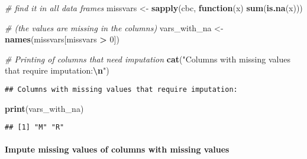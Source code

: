 \documentclass[
]{article}
\newenvironment{Shaded}{\begin{snugshade}}{\end{snugshade}}
\newcommand{\AttributeTok}[1]{\textcolor[rgb]{0.13,0.29,0.53}{#1}}
\newcommand{\CommentTok}[1]{\textcolor[rgb]{0.56,0.35,0.01}{\textit{#1}}}
\newcommand{\ConstantTok}[1]{\textcolor[rgb]{0.56,0.35,0.01}{#1}}
\newcommand{\ControlFlowTok}[1]{\textcolor[rgb]{0.13,0.29,0.53}{\textbf{#1}}}
\newcommand{\DecValTok}[1]{\textcolor[rgb]{0.00,0.00,0.81}{#1}}
\newcommand{\FunctionTok}[1]{\textcolor[rgb]{0.13,0.29,0.53}{\textbf{#1}}}
\newcommand{\NormalTok}[1]{#1}
\newcommand{\OtherTok}[1]{\textcolor[rgb]{0.56,0.35,0.01}{#1}}
\newcommand{\SpecialCharTok}[1]{\textcolor[rgb]{0.81,0.36,0.00}{\textbf{#1}}}
\newcommand{\StringTok}[1]{\textcolor[rgb]{0.31,0.60,0.02}{#1}}
\begin{document}
\begin{Shaded}
\begin{Highlighting}[]
\CommentTok{\# find it in all data frames }
\NormalTok{missvars }\OtherTok{\textless{}{-}} \FunctionTok{sapply}\NormalTok{(cbc, }\ControlFlowTok{function}\NormalTok{(x) }\FunctionTok{sum}\NormalTok{(}\FunctionTok{is.na}\NormalTok{(x)))}

\CommentTok{\# (the values are missing in the columns)}
\NormalTok{vars\_with\_na }\OtherTok{\textless{}{-}} \FunctionTok{names}\NormalTok{(missvars[missvars }\SpecialCharTok{\textgreater{}} \DecValTok{0}\NormalTok{])}

\CommentTok{\# Printing of columns that need imputation  }
\FunctionTok{cat}\NormalTok{(}\StringTok{"Columns with missing values that require imputation:}\SpecialCharTok{\textbackslash{}n}\StringTok{"}\NormalTok{)}
\end{Highlighting}
\end{Shaded}

\begin{verbatim}
## Columns with missing values that require imputation:
\end{verbatim}

\begin{Shaded}
\begin{Highlighting}[]
\FunctionTok{print}\NormalTok{(vars\_with\_na)}
\end{Highlighting}
\end{Shaded}

\begin{verbatim}
## [1] "M" "R"
\end{verbatim}

\paragraph{Impute missing values of columns with missing
values}\label{impute-missing-values-of-columns-with-missing-values}

\begin{Shaded}
\end{Shaded}
\end{document}
